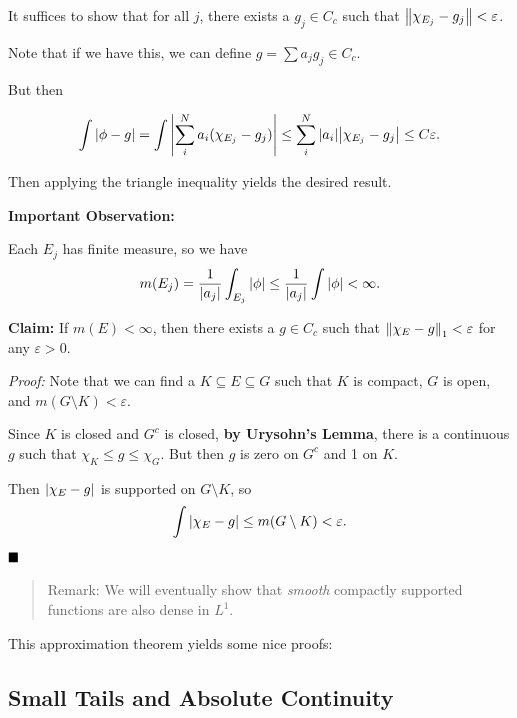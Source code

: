 It suffices to show that for all \(j\), there exists a \(g_j \in C_c\)
such that \({\left\lVert {\chi_{E_j} - g_j} \right\rVert} < \varepsilon\).

Note that if we have this, we can define \(g = \sum a_j g_j \in C_c\).

But then

\begin{align*}
\int{\left\lvert {\phi - g} \right\rvert} = \int {\left\lvert {\sum_i^N a_i (\chi_{E_j} - g_j) } \right\rvert} \leq \sum_i^N {\left\lvert {a_i} \right\rvert} {\left\lvert {\chi_{E_j} - g_j} \right\rvert} \leq C\varepsilon
.\end{align*}

Then applying the triangle inequality yields the desired result.

\textbf{Important Observation:}

Each \(E_j\) has finite measure, so we have
\begin{align*}
m(E_j) = \frac{1}{{\left\lvert {a_j} \right\rvert}} \int_{E_j} {\left\lvert {\phi} \right\rvert} \leq \frac{1}{{\left\lvert {a_j} \right\rvert}}\int {\left\lvert {\phi} \right\rvert} < \infty
.\end{align*}

\textbf{Claim:} If \(m(E) < \infty\), then there exists a \(g\in C_c\)
such that \({\left\lVert {\chi_E - g} \right\rVert}_1 < \varepsilon\) for any
\(\varepsilon > 0\).

\emph{Proof:} Note that we can find a \(K \subseteq E \subseteq G\) such
that \(K\) is compact, \(G\) is open, and
\(m(G\setminus K) < \varepsilon\).

Since \(K\) is closed and \(G^c\) is closed, \textbf{by Urysohn's
Lemma}, there is a continuous \(g\) such that
\(\chi_K \leq g \leq \chi_G\). But then \(g\) is zero on \(G^c\) and 1
on \(K\).

Then \({\left\lvert {\chi_E - g} \right\rvert}\) is supported on \(G\setminus K\), so
\begin{align*}
\int{\left\lvert {\chi_E - g} \right\rvert} \leq m(G\setminus K) < \varepsilon
.\end{align*} \(\qed\)

\begin{quote}
Remark: We will eventually show that \emph{smooth} compactly supported
functions are also dense in \(L^1\).
\end{quote}

This approximation theorem yields some nice proofs:

\hypertarget{small-tails-and-absolute-continuity}{%
\subsection{Small Tails and Absolute
Continuity}\label{small-tails-and-absolute-continuity}}

